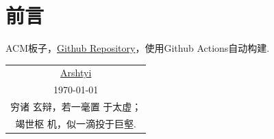 \newpage
\section*{前言}
ACM板子，\href{https://github.com/Arshtyi/ACM-Templates}{Github Repository}，使用Github Actions自动构建.
\begin{flushright}
    \begin{tabular}{c}
        \href{https://github.com/Arshtyi}{Arshtyi}\\
        \today \\ 穷诸
        玄辩，若一毫置
        于太虚；\\ 竭世枢
        机，似一滴投于巨壑.
    \end{tabular}
\end{flushright}
\thispagestyle{empty}